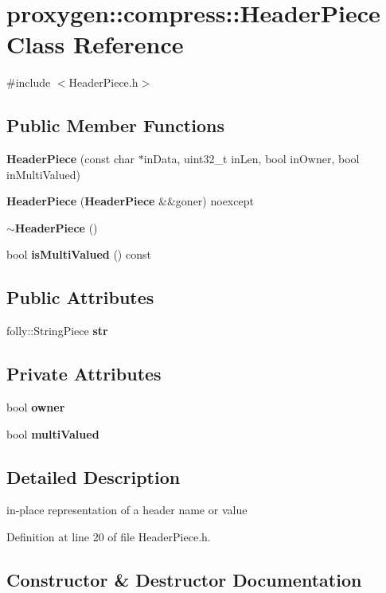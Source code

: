 \section{proxygen\+:\+:compress\+:\+:Header\+Piece Class Reference}
\label{classproxygen_1_1compress_1_1HeaderPiece}


{\ttfamily \#include $<$Header\+Piece.\+h$>$}

\subsection*{Public Member Functions}
\begin{DoxyCompactItemize}
\item 
{\bf Header\+Piece} (const char $\ast$in\+Data, uint32\+\_\+t in\+Len, bool in\+Owner, bool in\+Multi\+Valued)
\item 
{\bf Header\+Piece} ({\bf Header\+Piece} \&\&goner) noexcept
\item 
{\bf $\sim$\+Header\+Piece} ()
\item 
bool {\bf is\+Multi\+Valued} () const 
\end{DoxyCompactItemize}
\subsection*{Public Attributes}
\begin{DoxyCompactItemize}
\item 
folly\+::\+String\+Piece {\bf str}
\end{DoxyCompactItemize}
\subsection*{Private Attributes}
\begin{DoxyCompactItemize}
\item 
bool {\bf owner}
\item 
bool {\bf multi\+Valued}
\end{DoxyCompactItemize}


\subsection{Detailed Description}
in-\/place representation of a header name or value 

Definition at line 20 of file Header\+Piece.\+h.



\subsection{Constructor \& Destructor Documentation}
